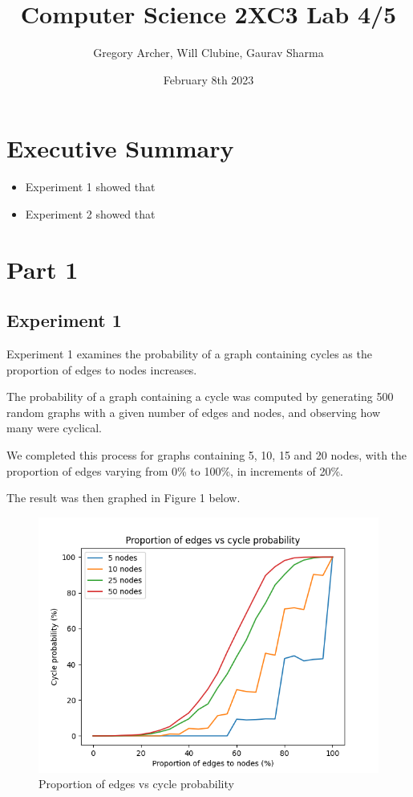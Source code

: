 \documentclass[titlepage]{article}
\title{Computer Science 2XC3 Lab 4/5}
\author{Gregory Archer, Will Clubine, Gaurav Sharma}
\date{February 8th 2023}
\begin{document}
\maketitle
\tableofcontents
\listoffigures

\newpage

\section{Executive Summary}
\begin{itemize}
    \item Experiment 1 showed that
    \item Experiment 2 showed that
\end{itemize}

\section{Part 1}

\subsection{Experiment 1}

Experiment 1 examines the probability of a graph containing cycles as the proportion of edges to nodes increases.

The probability of a graph containing a cycle was computed by generating 500 random graphs with a given number of edges and nodes, and observing how many were cyclical.

We completed this process for graphs containing 5, 10, 15 and 20 nodes, with the proportion of edges varying from 0\% to 100\%, in increments of 20\%.

The result was then graphed in Figure 1 below.

\begin{figure}[H]
    \centering
    \includegraphics[width=0.8\linewidth]{experiment_1.png}
    \caption{Proportion of edges vs cycle probability}
    \label{fig:edges_vs_cycle}
\end{figure}
\end{document}

